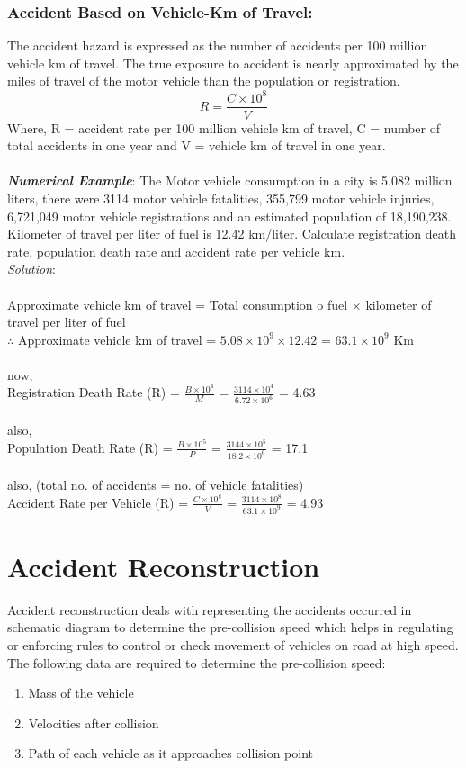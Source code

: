 \subsubsection{Accident Based on Vehicle-Km of Travel:}
The accident hazard is expressed as the number of accidents per 100 million vehicle km of travel. The true exposure to accident is nearly approximated by the miles of travel of the motor vehicle than the population or registration.
\begin{equation}
	R = \frac{C \times 10^8}{V}
\end{equation}
Where, R = accident rate per 100 million vehicle km of travel, C = number of total accidents in one year and V = vehicle km of travel in one year.\\\\
%
\textbf{\textit{Numerical Example}}: The Motor vehicle consumption in a city is 5.082 million liters, there were 3114 motor vehicle fatalities, 355,799 motor vehicle injuries, 6,721,049 motor vehicle registrations and an estimated population of 18,190,238. Kilometer of travel per liter of fuel is 12.42 km/liter. Calculate registration death rate, population death rate and accident rate per vehicle km.\\
\textit{Solution}:\\\\
Approximate vehicle km of travel = Total consumption o fuel $ \times $ kilometer of travel per liter of fuel\\
$ \therefore $ Approximate vehicle km of travel = $ 5.08 \times 10^9 \times 12.42 $ = $ 63.1 \times 10^9 $ Km\\\\
now,\\
Registration Death Rate (R) = $ \frac{B \times 10^4}{M} $ = $ \frac{3114 \times 10^4}{6.72 \times 10^6} $ = 4.63\\\\
also,\\
Population Death Rate (R) = $ \frac{B \times 10^5}{P} $ = $ \frac{3144 \times 10^5}{18.2 \times 10^6} $ = 17.1\\\\
also, (total no. of accidents = no. of vehicle fatalities)\\
Accident Rate per Vehicle (R) = $ \frac{C \times 10^8}{V} $ = $ \frac{3114 \times 10^8}{63.1 \times 10^9} $ = 4.93
\section{Accident Reconstruction}
Accident reconstruction deals with representing the accidents occurred in schematic diagram to determine the pre-collision speed which helps in regulating or enforcing rules to control or check movement of vehicles on road at high speed. The following data are required to determine the pre-collision speed:
\begin{enumerate}
	\item Mass of the vehicle
	\item Velocities after collision
	\item Path of each vehicle as it approaches collision point
\end{enumerate}
